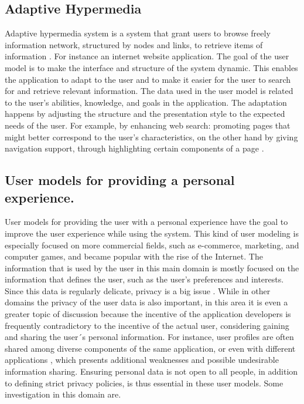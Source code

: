 \subsection{Adaptive Hypermedia}

Adaptive hypermedia system is a system that grant users to browse freely
information network,  structured by nodes and links, to retrieve items of
information \cite{deepa2012adaptive}. For instance an internet website
application. The goal of the user model is to make the interface and structure
of the system dynamic. This enables the application to adapt to the user and to
make it easier for the user to search for and retrieve relevant information.
The data used in the user model is related to the user’s abilities, knowledge,
and goals in the application. The adaptation happens by adjusting the structure
and the presentation style to the expected needs of the user. For example, by
enhancing web search: promoting pages that might better correspond to the user’s
characteristics, on the other hand by giving navigation support, through
highlighting certain components of a page \cite{razmerita2012user}.

\subsection{User models for providing a personal experience.}

User models for providing the user with a personal experience have the goal to
improve the user experience while using the system.  This kind of user modeling
is especially focused on more commercial fields, such as e-commerce, marketing,
and computer games, and became popular with the rise of the Internet.  The
information that is used by the user in this main domain is mostly focused on
the information that defines the user, such as the user’s preferences and
interests. Since this data is regularly delicate, privacy is a  big issue
\cite{toch2012personalization}. While in other domains the privacy of the user
data is also important, in this area it is even a greater topic of discussion
because the incentive of the application developers is frequently contradictory
to the incentive of the actual user, considering gaining and sharing the user´s
personal information. For instance, user profiles are often shared among diverse
components of the same application, or even with different applications
\cite{brun2010compass} \cite{karam2012modeling}, which presents additional
weaknesses and possible undesirable information sharing.  Ensuring personal data
is not open to all people, in addition to defining strict privacy policies, is
thus essential in these user models. Some investigation in this domain are.

